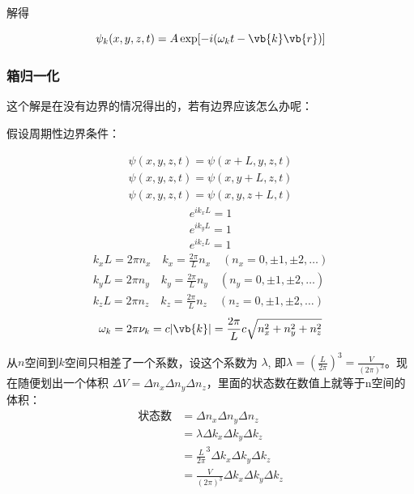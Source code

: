 解得

\begin{equation}
	\psi_k(x,y,z,t)=A\exp[ -i(\omega_k t-\vb{k}\vb{r}) ]
\end{equation}


\subsubsection{箱归一化}%

这个解是在没有边界的情况得出的，若有边界应该怎么办呢：

假设周期性边界条件：

\begin{subequations}
	\begin{align}
		\psi(x,y,z,t) = \psi(x+L,y,z,t)\\
		\psi(x,y,z,t) = \psi(x,y+L,z,t)\\
		\psi(x,y,z,t) = \psi(x,y,z+L,t)
	\end{align}
\end{subequations}
\begin{subequations}
	\begin{align}
	e^{i k_x L} = 1\\
	e^{i k_y L} = 1\\
	e^{i k_z L} = 1
	\end{align}
\end{subequations}
\begin{subequations}
	\begin{align}
		k_x L = 2\pi n_x \quad k_x=\frac{2\pi}{L}n_x  \quad (n_x=0,\pm 1,\pm 2, \ldots)\\
		k_y L = 2\pi n_y \quad k_y=\frac{2\pi}{L}n_y  \quad (n_y=0,\pm 1,\pm 2, \ldots)\\
		k_z L = 2\pi n_z \quad k_z=\frac{2\pi}{L}n_z  \quad (n_z=0,\pm 1,\pm 2, \ldots)
	\end{align}
\end{subequations}
\begin{equation*}
	\omega_k=2\pi \nu_k = c|\vb{k}| = \frac{2\pi}{L}c\sqrt{n_x^2+n_y^2+n_z^2} 
\end{equation*}

从$n$空间到$k$空间只相差了一个系数，设这个系数为 $\lambda$, 即$\lambda = \left(\frac{L}{2 \pi}\right)^3 = \frac{V}{\left(2 \pi\right)^3}$。现在随便划出一个体积 $\Delta V=\Delta n_x \Delta n_y \Delta n_z$，里面的状态数在数值上就等于n空间的体积：
\begin{equation}
	\begin{aligned}
		\label{eq:space}
		\text{状态数} &=  \Delta n_x \Delta n_y \Delta n_z \\
		&= \lambda \Delta k_x \Delta k_y \Delta k_z \\
		&=   \frac{L}{2 \pi} ^3 \Delta k_x \Delta k_y \Delta k_z  \\
		&=   \frac{V}{{\left( 2 \pi \right)}^3} \Delta k_x \Delta k_y \Delta k_z
	\end{aligned}
\end{equation}

